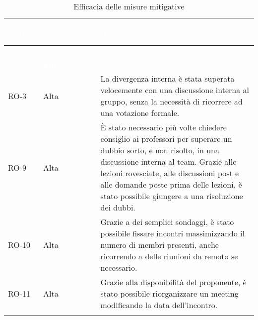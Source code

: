 {
\setlength{\tabcolsep}{10pt}
\renewcommand{\arraystretch}{1.5}
\begin{xltabular}{\textwidth}{| l | l | X |}
    \hline
     \textbf{\textcolor{white}{Codice}} & \textbf{\textcolor{white}{Efficacia mitigazione}} & \textbf{\textcolor{white}{Analisi}} \\
    \hline
    \endfirsthead
    \hline
     \textbf{\textcolor{white}{Codice}} & \textbf{\textcolor{white}{Efficacia mitigazione}} & \textbf{\textcolor{white}{Analisi}} \\
    \hline
    \endhead
    RO-3 & Alta & La divergenza interna è stata superata velocemente con una discussione interna al gruppo, senza la necessità di ricorrere ad una votazione formale. \\
    \hline
    RO-9 & Alta & È stato necessario più volte chiedere consiglio ai professori per superare un dubbio sorto, e non risolto, in una discussione interna al team. Grazie alle lezioni rovesciate, alle discussioni post  e alle domande poste prima delle lezioni, è stato possibile giungere a una risoluzione dei dubbi. \\
    \hline
    RO-10 & Alta & Grazie a dei semplici sondaggi, è stato possibile fissare incontri massimizzando il numero di membri presenti, anche ricorrendo a delle riunioni da remoto se necessario. \\
    \hline
    RO-11 & Alta & Grazie alla disponibilità del proponente, è stato possibile riorganizzare un meeting modificando la data dell'incontro. \\
    \hline
    
     \caption{Efficacia delle misure mitigative}
    \label{tab:mitigazioni}
\end{xltabular}
}


\newpage